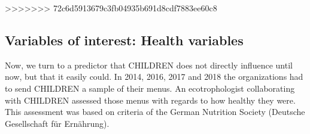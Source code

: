 \documentclass[12pt, a4paper, titlepage]{article}\usepackage[]{graphicx}\usepackage[]{color}
\begin{document}
\begin{table}
\begin{center}
\caption{Regression Results: dayToDaySkills}
\label{DayToDaySkillsRegressions}
\end{center}
\end{table}

>>>>>>> 72c6d5913679c3fb04935b691d8cdf7883ee60c8

\subsection{Variables of interest: Health variables} 

Now, we turn to a predictor that CHILDREN does not directly influence until now, but that it easily could. In 2014, 2016, 2017 and 2018 the organizations had to send CHILDREN a sample of their menus. An ecotrophologist collaborating with CHILDREN assessed those menus with regards to how healthy they were. This assessment was based on criteria of the German Nutrition Society (Deutsche Gesellschaft für Ernährung).
\end{document}
